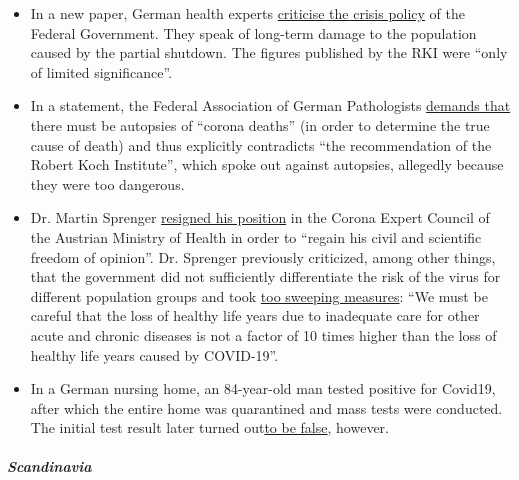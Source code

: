 \begin{itemize}
\tightlist
\item
  In a new paper, German health experts
  \href{https://www.tagesschau.de/investigativ/ndr-wdr/corona-experten-thesenpapier-101.html}{criticise
  the crisis policy} of the Federal Government. They speak of long-term
  damage to the population caused by the partial shutdown. The figures
  published by the RKI were ``only of limited significance''.
\item
  In a statement, the Federal Association of German Pathologists
  \href{https://www.pathologie-dgp.de/die-dgp/aktuelles/meldung/pressemitteilung-an-corona-verstorbene-sollten-obduziert-werden/}{demands
  that} there must be autopsies of ``corona deaths'' (in order to
  determine the true cause of death) and thus explicitly contradicts
  ``the recommendation of the Robert Koch Institute'', which spoke out
  against autopsies, allegedly because they were too dangerous.
\item
  Dr. Martin Sprenger
  \href{https://mailchi.mp/addendum/fles-home-office-260342}{resigned
  his position} in the Corona Expert Council of the Austrian Ministry of
  Health in order to ``regain his civil and scientific freedom of
  opinion''. Dr. Sprenger previously criticized, among other things,
  that the government did not sufficiently differentiate the risk of the
  virus for different population groups and took
  \href{https://www.addendum.org/coronavirus/interview-sprenger/}{too
  sweeping measures}: ``We must be careful that the loss of healthy life
  years due to inadequate care for other acute and chronic diseases is
  not a factor of 10 times higher than the loss of healthy life years
  caused by COVID-19''.
\item
  In a German nursing home, an 84-year-old man tested positive for
  Covid19, after which the entire home was quarantined and mass tests
  were conducted. The initial test result later turned
  out\href{https://www.schwerin.de/news/4a3e5560-78c9-11ea-b543-1967de695b51/}{to
  be false}, however.
\end{itemize}

\hypertarget{scandinavia}{%
\subparagraph{\texorpdfstring{\textbf{Scandinavia}}{Scandinavia}}\label{scandinavia}}

